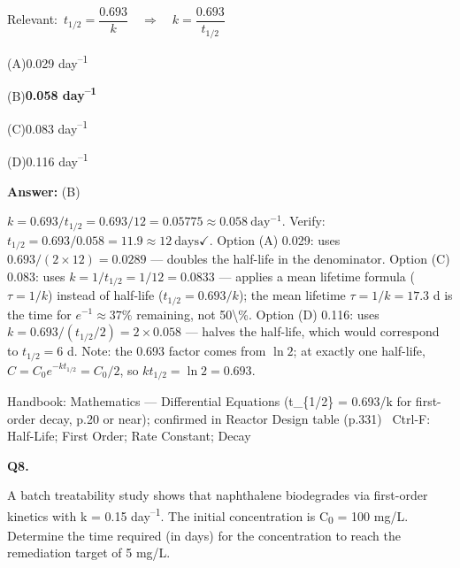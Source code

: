 \documentclass[11pt]{article}
\newcommand{\correct}[1]{\textbf{#1}\;{\color{accent}$\checkmark$}}
\newcommand{\optline}[2]{\par\noindent\hspace{1.2em}(#1)\hspace{0.6em}#2}
\begin{document}
{\small\color{soft}Relevant:}\ $t_{1/2} = \dfrac{0.693}{k}\quad\Rightarrow\quad k = \dfrac{0.693}{t_{1/2}}$\par\vspace{3pt}
\optline{A}{0.029 day\textsuperscript{--}\textsuperscript{1}}
\optline{B}{\correct{0.058 day\textsuperscript{--}\textsuperscript{1}}}
\optline{C}{0.083 day\textsuperscript{--}\textsuperscript{1}}
\optline{D}{0.116 day\textsuperscript{--}\textsuperscript{1}}
\par\vspace{3pt}
\vspace{2pt}\par\noindent\colorbox{boxbg}{\parbox{\dimexpr\linewidth-2\fboxsep\relax}{%
\vspace{2pt}\textbf{Answer:} (B)\par\vspace{2pt}
{\small $k = 0.693/t_{1/2} = 0.693/12 = 0.05775\approx0.058\ \mathrm{day^{-1}}$. Verify: $t_{1/2} = 0.693/0.058 = 11.9\approx12\ \mathrm{days}$$\checkmark$. Option (A) 0.029: uses $0.693/(2\times12) = 0.0289$ --- doubles the half-life in the denominator. Option (C) 0.083: uses $k = 1/t_{1/2} = 1/12 = 0.0833$ --- applies a mean lifetime formula ($\tau = 1/k$) instead of half-life ($t_{1/2} = 0.693/k$); the mean lifetime $\tau = 1/k = 17.3$ d is the time for $e^{-1}\approx37\%$ remaining, not 50\textbackslash{}\%. Option (D) 0.116: uses $k = 0.693/(t_{1/2}/2) = 2\times0.058$ --- halves the half-life, which would correspond to $t_{1/2} = 6$ d. Note: the 0.693 factor comes from $\ln 2$; at exactly one half-life, $C = C_0 e^{-k t_{1/2}} = C_0/2$, so $k t_{1/2} = \ln 2 = 0.693$.}\par\vspace{2pt}
{\footnotesize\color{soft}Handbook: Mathematics --- Differential Equations (t\_\{1/2\} = 0.693/k for first-order decay, p.20 or near); confirmed in Reactor Design table (p.331) \textbullet\ Ctrl-F: Half-Life; First Order; Rate Constant; Decay}\vspace{2pt}
}}
\vspace{9pt}
\filbreak
\textbf{\color{accent}Q8.}\par\vspace{2pt}
A batch treatability study shows that naphthalene biodegrades via first-order kinetics with k = 0.15 day\textsuperscript{--}\textsuperscript{1}. The initial concentration is C\textsubscript{0} = 100 mg/L. Determine the time required (in days) for the concentration to reach the remediation target of 5 mg/L.\par\vspace{3pt}
\end{document}
